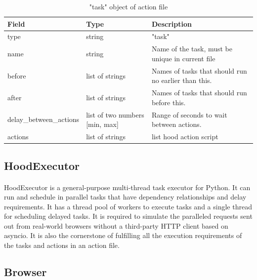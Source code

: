 \documentclass[mscthesis]{usiinfthesis}
\begin{document}
\begin{table}[H]
  \centering
  \begin{tabular}{|p{34mm}|p{26mm}|p{65mm}|}
    \hline
    Field                   & Type                           & Description                                          \\
    \hline
    type                    & string                         & "task"                                               \\
    name                    & string                         & Name of the task, must be unique in current file     \\
    before                  & list of strings                & Names of tasks that should run no earlier than this. \\
    after                   & list of strings                & Names of tasks that should run before this.          \\
    delay\_between\_actions & list of two numbers [min, max] & Range of seconds to wait between actions.            \\
    actions                 & list of strings                & list hood action script                              \\
    \hline
  \end{tabular}
  \caption{"task" object of action file}
  \label{tab:task_object}
\end{table}

\subsection{HoodExecutor}
\paragraph{}
HoodExecutor is a general-purpose multi-thread task executor for Python. It can run and schedule in parallel tasks that have dependency relationships and delay requirements. It has a thread pool of workers to execute tasks and a single thread for scheduling delayed tasks. It is required to simulate the paralleled requests sent out from real-world browsers without a third-party HTTP client based on asyncio. It is also the cornerstone of fulfilling all the execution requirements of the tasks and actions in an action file.

\subsection{Browser}\label{sec:browser}
\end{document}
